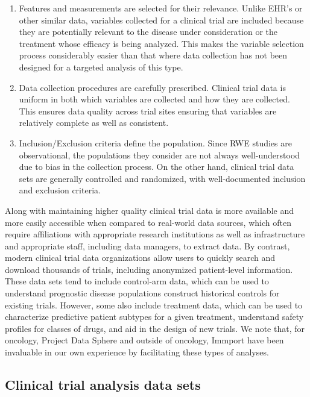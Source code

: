 \begin{enumerate}
\def\labelenumi{\arabic{enumi}.}
\tightlist
\item
  Features and measurements are selected for their relevance. Unlike
  EHR's or other similar data, variables collected for a clinical trial
  are included because they are potentially relevant to the disease
  under consideration or the treatment whose efficacy is being analyzed.
  This makes the variable selection process considerably easier than
  that where data collection has not been designed for a targeted
  analysis of this type.
\item
  Data collection procedures are carefully prescribed. Clinical trial
  data is uniform in both which variables are collected and how they are
  collected. This ensures data quality across trial sites ensuring that
  variables are relatively complete as well as consistent.
\item
  Inclusion/Exclusion criteria define the population. Since RWE studies
  are observational, the populations they consider are not always
  well-understood due to bias in the collection process. On the other
  hand, clinical trial data sets are generally controlled and
  randomized, with well-documented inclusion and exclusion criteria.
\end{enumerate}

Along with maintaining higher quality clinical trial data is more
available and more easily accessible when compared to real-world data
sources, which often require affiliations with appropriate research
institutions as well as infrastructure and appropriate staff, including
data managers, to extract data. By contrast, modern clinical trial data
organizations allow users to quickly search and download thousands of
trials, including anonymized patient-level information. These data sets
tend to include control-arm data, which can be used to understand
prognostic disease populations construct historical controls for
existing trials. However, some also include treatment data, which can be
used to characterize predictive patient subtypes for a given treatment,
understand safety profiles for classes of drugs, and aid in the design
of new trials. We note that, for oncology, Project Data Sphere
\citep{PDS} and outside of oncology, Immport \citep{Immport} have been
invaluable in our own experience by facilitating these types of
analyses.

\hypertarget{clinical-trial-analysis-data-sets}{%
\subsection{Clinical trial analysis data
sets}\label{clinical-trial-analysis-data-sets}}

